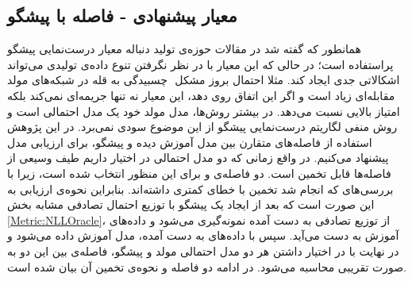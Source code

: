 \subsection{معیار پیشنهادی - فاصله با پیشگو }\label{Metric:DistanceOracle}
همانطور که گفته شد در مقالات حوزه‌ی تولید دنباله معیار درست‌نمایی پیشگو پراستفاده است؛ در حالی که این معیار با در نظر نگرفتن تنوع داده‌ی تولیدی می‌تواند اشکالاتی جدی ایجاد کند. مثلا احتمال بروز مشکل ‌  چسبیدگی به قله  در شبکه‌های مولد مقابله‌ای زیاد است و اگر این اتفاق روی دهد، این معیار نه تنها جریمه‌ای نمی‌کند بلکه امتیاز بالایی نسبت می‌دهد.
\newline
در بیشتر روش‌ها، مدل مولد خود یک مدل احتمالی است و روش منفی لگاریتم درست‌نمایی پیشگو از این موضوع سودی نمی‌برد.
در این پژوهش استفاده از فاصله‌های متقارن بین مدل آموزش دیده و  پیشگو، برای ارزیابی مدل پیشنهاد می‌کنیم. در واقع زمانی که دو مدل احتمالی در اختیار داریم طیف وسیعی از فاصله‌ها قابل تخمین است.
دو فاصله‌ی
و
برای این منظور انتخاب شده است، زیرا با بررسی‌های که انجام شد تخمین با خطای کمتری داشته‌اند.
\newline
بنابراین نحوه‌ی ارزیابی به این صورت است که بعد از ایجاد یک  پیشگو با توزیع  احتمال تصادفی مشابه بخش 
\ref{Metric:NLLOracle}،
از توزیع تصادفی به دست آمده نمونه‌گیری می‌شود و داده‌های‌ آموزش به دست می‌آید.  سپس با داده‌ها‌ی به دست آمده، مدل آموزش داده می‌شود و در نهایت با در اختیار داشتن هر دو مدل احتمالی مولد و پیشگو، فاصله‌ی بین این دو به صورت تقریبی محاسبه می‌شود. در ادامه دو فاصله و نحوه‌ی تخمین آن بیان شده است.
